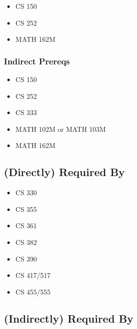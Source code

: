 \documentclass[]{article}
\providecommand{\tightlist}{%
  \setlength{\itemsep}{0pt}\setlength{\parskip}{0pt}}
\begin{document}
\begin{itemize}
\tightlist
\item
  CS 150
\item
  CS 252
\item
  MATH 162M
\end{itemize}

\subsubsection{Indirect Prereqs}\label{indirect-prereqs-4}

\begin{itemize}
\tightlist
\item
  CS 150
\item
  CS 252
\item
  CS 333
\item
  MATH 102M or MATH 103M
\item
  MATH 162M
\end{itemize}

\subsection{(Directly) Required By}\label{directly-required-by-2}

\begin{itemize}
\tightlist
\item
  CS 330
\item
  CS 355
\item
  CS 361
\item
  CS 382
\item
  CS 390
\item
  CS 417/517
\item
  CS 455/555
\end{itemize}

\subsection{(Indirectly) Required By}\label{indirectly-required-by-2}
\end{document}
